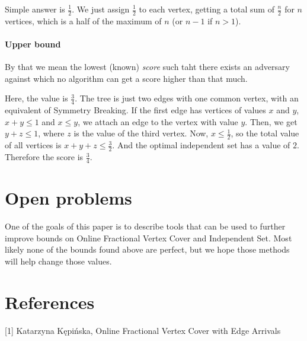 \documentclass[12pt, A4]{article}
\begin{document}
Simple answer is $\frac{1}{2}$. We just assign $\frac{1}{2}$ to each vertex, getting a total sum of $\frac{n}{2}$ for $n$ vertices, which is a half of the maximum of $n$ (or $n-1$ if $n > 1$).


\paragraph{Upper bound}
By that we mean the lowest (known) \textit{score} such taht there exists an adversary against which no algorithm can get a score higher than that much.

Here, the value is $\frac{3}{4}$. The tree is just two edges with one common vertex, with an equivalent of Symmetry Breaking. If the first edge has vertices of values $x$ and $y$, $x + y \le 1$ and $x \le y$, we attach an edge to the vertex with value $y$. Then, we get $y + z \le 1$, where $z$ is the value of the third vertex. Now, $x \le \frac{1}{2}$, so the total value of all vertices is $x + y + z \le \frac{3}{2}$. And the optimal independent set has a value of $2$. Therefore the score is $\frac{3}{4}$.



\section{Open problems}
One of the goals of this paper is to describe tools that can be used to further improve bounds on Online Fractional Vertex Cover and Independent Set. Most likely none of the bounds found above are perfect, but we hope those methods will help change those values.



\section*{References}
[1] Katarzyna Kępińska, Online Fractional Vertex Cover with Edge Arrivals

\end{document}
